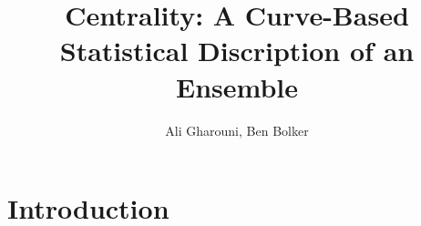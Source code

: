 \documentclass[12pt]{article}
\title{Centrality: A Curve-Based Statistical Discription of an Ensemble}
\author{Ali Gharouni, Ben Bolker}
\newcommand{\comment}{\showcomment}
\newcommand{\showcomment}[3]{\textcolor{#1}{\textbf{[#2: }\textsl{#3}\textbf{]}}}
\newcommand{\ali}[1]{\comment{magenta}{Ali}{#1}}
\newcommand{\bmb}[1]{\comment{red}{BMB}{#1}}
\theoremstyle{definition} %
\begin{document}
\maketitle
\linenumbers


 
\section{Introduction}

\end{document}
